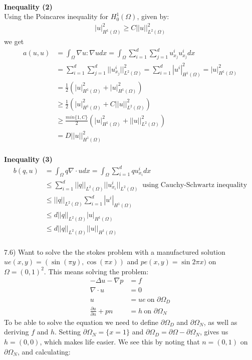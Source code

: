 \documentclass[11pt,a4paper]{report}
\begin{document}
\\
\textbf{Inequality (2)}
\\
Using the Poincares inequality for $H_0^1(\Omega)$, given by: 
\begin{align*}
|u|_{H^1(\Omega)}^2\geq C||u||_{L^2(\Omega)}^2
\end{align*} 
we get 
\begin{align*}
a(u,u)&= \int_{\Omega}\nabla u : \nabla u dx=\int_{\Omega}\sum_{i=1}^d\sum_{j=1}^d u_{x_j}^iu_{x_j}^idx \\
&=\sum_{i=1}^d\sum_{j=1}^d ||u_{x_j}^i||_{L^2(\Omega)}^2=\sum_{i=1}^d |u^i|_{H^1(\Omega)}^2 = |u|_{H^1(\Omega)}^2 \\
&= \frac{1}{2}(|u|_{H^1(\Omega)}^2+|u|_{H^1(\Omega)}^2) \\
&\geq \frac{1}{2}(|u|_{H^1(\Omega)}^2+C||u||_{L^2(\Omega)}^2) \\
&\geq \frac{min\{1,C\}}{2}(|u|_{H^1(\Omega)}^2+||u||_{L^2(\Omega)}^2) \\
&= D||u||_{H^1(\Omega)}^2
\end{align*}
\\
\textbf{Inequality (3)}
\\
\begin{align*}
b(q,u)&=\int_{\Omega} q\nabla \cdot u dx=\int_{\Omega}\sum_{i=1}^d qu_{x_i}^i dx \\
&\leq \sum_{i=1}^d ||q||_{L^2(\Omega)} ||u_{x_i}^i||_{L^2(\Omega)} \ \text{  using Cauchy-Schwartz inequality}  \\
&\leq ||q||_{L^2(\Omega)}\sum_{i=1}^d |u^i|_{H^1(\Omega)} \\
&\leq d||q||_{L^2(\Omega)}|u|_{H^1(\Omega)} \\
&\leq d||q||_{L^2(\Omega)}||u||_{H^1(\Omega)}
\end{align*}
\\
7.6) Want to solve the the stokes problem with a manufactured solution $ue(x,y)=(\sin(\pi y),\cos(\pi x))$ and $pe(x,y)=\sin2\pi x)$ on $\Omega = (0,1)^2$. This means solving the problem:
\begin{align*}
-\Delta u - \nabla p &= f \\
\nabla \cdot u &= 0 \\
u &= ue \ \text{on } \partial\Omega_D \\
\frac{\partial u}{\partial n} + pn &= h \ \text{on } \partial\Omega_N
\end{align*} 
To be able to solve the equation we need to define $\partial\Omega_D$ and $\partial\Omega_N$, as well as deriving $f$ and $h$. Setting $\partial\Omega_N= \{x=1\}$ and $\partial\Omega_D=\partial\Omega - \partial\Omega_N$, gives us $h=(0,0)$, which makes life easier. We see this by noting that $n=(0,1)$ on $\partial\Omega_N$, and calculating:
\end{document}
